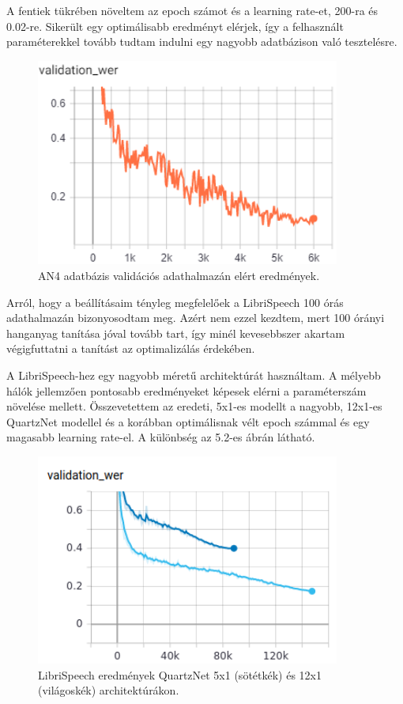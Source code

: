 A fentiek tükrében növeltem az epoch számot és a learning rate-et, 200-ra és 0.02-re. Sikerült egy optimálisabb eredményt elérjek, így a felhasznált paraméterekkel tovább tudtam indulni egy nagyobb adatbázison való tesztelésre.

\begin{figure}[!ht]
\centering
\includegraphics[width=100mm, keepaspectratio]{figures/an4_wer.png}
\caption{AN4 adatbázis validációs adathalmazán elért eredmények.}
\label{fig:TeXstudio}
\end{figure}

Arról, hogy a beállításaim tényleg megfelelőek a LibriSpeech 100 órás adathalmazán bizonyosodtam meg. Azért nem ezzel kezdtem, mert 100 órányi hanganyag tanítása jóval tovább tart, így minél kevesebbszer akartam végigfuttatni a tanítást az optimalizálás érdekében.

A LibriSpeech-hez egy nagyobb méretű architektúrát használtam. A mélyebb hálók jellemzően pontosabb eredményeket képesek elérni a paraméterszám növelése mellett. Összevetettem az eredeti, 5x1-es modellt a nagyobb, 12x1-es QuartzNet modellel és a korábban optimálisnak vélt epoch számmal és egy magasabb learning rate-el. A különbség az 5.2-es ábrán látható.

\begin{figure}[!ht]
\centering
\includegraphics[width=100mm, keepaspectratio]{figures/architecture_comparrison.png}
\caption{LibriSpeech eredmények QuartzNet 5x1 (sötétkék) és 12x1 (világoskék) architektúrákon.}
\label{fig:TeXstudio}
\end{figure}

